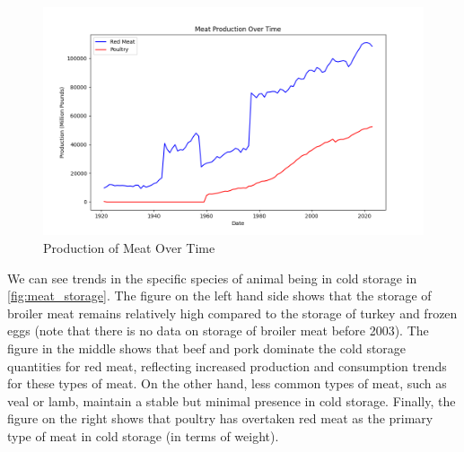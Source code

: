 \documentclass[12pt]{article}
\begin{document}
\begin{figure}[H]
    \centering
    \begin{minipage}{.5\textwidth}
        \centering
        \includegraphics[width=1\linewidth]{images/Meat Production.png}
        \caption{Production of Meat Over Time}
        \label{fig:meat_production}
    \end{minipage}
\end{figure}

We can see trends in the specific species of animal being in cold storage in \ref{fig:meat_storage}. The figure on the left hand side shows that the storage of broiler meat remains relatively high compared to the storage of turkey and frozen eggs (note that there is no data on storage of broiler meat before 2003). The figure in the middle shows that beef and pork dominate the cold storage quantities for red meat, reflecting increased production and consumption trends for these types of meat. On the other hand, less common types of meat, such as veal or lamb, maintain a stable but minimal presence in cold storage. Finally, the figure on the right shows that poultry has overtaken red meat as the primary type of meat in cold storage (in terms of weight).
\end{document}
